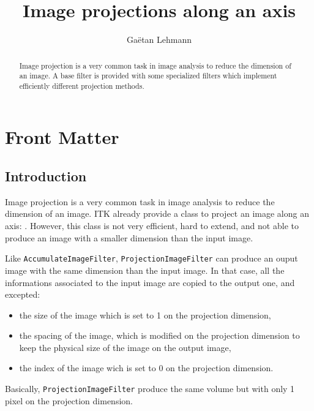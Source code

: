 \documentclass{InsightArticle}
\title{Image projections along an axis}
\author{Ga\"etan Lehmann}
\begin{document}
\maketitle

\ifhtml
\chapter*{Front Matter\label{front}}
\fi


\begin{abstract}
\noindent
Image projection is a very common task in image analysis to reduce the dimension
of an image. A base filter is provided with some specialized filters which
implement efficiently different projection methods.
\end{abstract}


\section{Introduction}
Image projection is a very common task in image analysis to reduce the dimension
of an image. ITK already provide a class to project an image along an axis:
. However, this class is not very efficient,
hard to extend, and not able to produce an image with a smaller dimension than
the input image.

Like \verb$AccumulateImageFilter$, \verb$ProjectionImageFilter$ can produce an
ouput image with the same dimension than the input image. In that case, all
the informations associated to the input image are copied to the output one,
and excepted:
\begin{itemize}
  \item the size of the image which is set to 1 on the projection dimension,
  \item the spacing of the image, which is modified on the projection dimension
to keep the physical size of the image on the output image,
  \item the index of the image wich is set to 0 on the projection dimension.
\end{itemize}
Basically, \verb$ProjectionImageFilter$ produce the same volume but with
only 1 pixel on the projection dimension.
\end{document}

